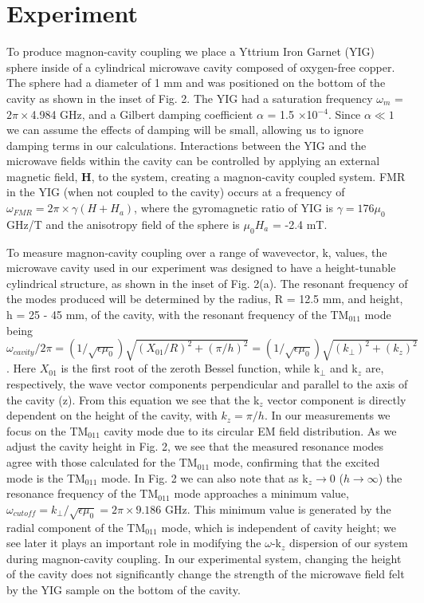 \documentclass[prb,twocolumn,showpacs,preprintnumbers,amsmath,amssymb]{revtex4-1}
\begin{document}
\section{Experiment}

To produce magnon-cavity coupling we place a Yttrium Iron Garnet (YIG) sphere\cite{S} inside of a cylindrical microwave cavity composed of oxygen-free copper. The sphere had a diameter of 1 mm and was positioned on the bottom of the cavity as shown in the inset of Fig. 2. The YIG had a saturation frequency $\omega_{m}$ = $2\pi\times$4.984 GHz, and a Gilbert damping coefficient $\alpha$ = 1.5 $\times$10$^{-4}$. Since $\alpha\ll 1$ we can assume the effects of damping will be small, allowing us to ignore damping terms in our calculations. Interactions between the YIG and the microwave fields within the cavity can be controlled by applying an external magnetic field, \textbf{H}, to the system, creating a magnon-cavity coupled system. FMR in the YIG (when not coupled to the cavity) occurs at a frequency of $\omega_{FMR}=2\pi\times\gamma(H+H_{a})$, where the gyromagnetic ratio of YIG is $\gamma=176\mu_{0}$ GHz/T and the anisotropy field of the sphere is $\mu_{0}H_{a}$ = -2.4 mT.

To measure magnon-cavity coupling over a range of wavevector, k, values, the microwave cavity used in our experiment was designed to have a height-tunable cylindrical structure, as shown in the inset of Fig. 2(a). The resonant frequency of the modes produced will be determined by the radius, R = 12.5 mm, and height, h = 25 - 45 mm, of the cavity, with the resonant frequency of the TM$_{011}$ mode being\cite{T} $\omega_{cavity}/2\pi=(1/\sqrt{\epsilon\mu_{0}})\sqrt{(X_{01}/R)^{2}+(\pi/h)^{2}}=(1/\sqrt{\epsilon\mu_{0}})\sqrt{(k_{\perp})^{2}+(k_{z})^{2}}$. Here $X_{01}$ is the first root of the zeroth Bessel function, while k$_{\perp}$ and k$_{z}$ are, respectively, the wave vector components perpendicular and parallel to the axis of the cavity (z). From this equation we see that the k$_{z}$ vector component is directly dependent on the height of the cavity, with $k_{z}=\pi/h$. In our measurements we focus on the TM$_{011}$ cavity mode due to its circular EM field distribution. As we adjust the cavity height in Fig. 2, we see that the measured resonance modes agree with those calculated for the TM$_{011}$ mode, confirming that the excited mode is the TM$_{011}$ mode. In Fig. 2 we can also note that as k$_{z}\rightarrow 0$ ($h\rightarrow\infty$) the resonance frequency of the TM$_{011}$ mode approaches a minimum value, $\omega_{cutoff}=k_{\perp}/\sqrt{\epsilon\mu_{0}}=2\pi\times9.186$ GHz. This minimum value is generated by the radial component of the TM$_{011}$ mode, which is independent of cavity height; we see later it plays an important role in modifying the $\omega$-k$_{z}$ dispersion of our system during magnon-cavity coupling. In our experimental system, changing the height of the cavity does not significantly change the strength of the microwave field felt by the YIG sample on the bottom of the cavity.
\end{document}
